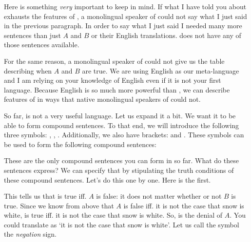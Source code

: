 Here is something \emph{very} important to keep in mind. If what I have told you 
about \lL[S]{} exhausts the features of \lL[S]{}, a monolingual speaker of \lL[S]{} 
could not say what I just said in the previous paragraph. In order to say what I 
just said I needed many more sentences than just $A$ and $B$ or their English 
translations. \lL[S]{} does not have any of those sentences available.

For the same reason, a monolingual speaker of \lL[S]{} could not give us the table 
describing when $A$ and $B$ are true. We are using English as our meta-language 
and I am relying on your knowledge of English even if it is not your first 
language.  Because English is so much more powerful than \lL[S]{}, we can describe 
features of \lL[S]{} in ways that native monolingual speakers of \lL[S]{} could not.

So far, \lL[S]{} is not a very useful language. Let us expand it a bit. We want it to 
be able to form compound sentences. To that end, we will introduce the following 
three symbols: \p{\lnot}, \p{\land}, \p{\lor}. Additionally, we also have 
brackets: \p{(} and \p{)}.  These symbols can be used to form the following 
compound sentences:

\begin{slist}

 \item {}

 \item {}

 \item {}
 
\end{slist}

These are the only compound sentences you can form in \lL[S]{} so far. What do 
these sentences express? We can specify that by stipulating the truth conditions 
of these compound sentences. Let's do this one by one. Here is the first.

\begin{center}


\end{center}

This tells us that  is true iff. $A$ is false: it does not matter 
whether or not $B$ is true. Since we know from above that $A$ is false iff. it 
is not the case that snow is white,  is true iff. it is not the case 
that snow is white. So,  is the denial of $A$. You could translate 
 as `it is not the case that snow is white'. Let us call the \p{\lnot} 
symbol the \emph{negation} sign. 


